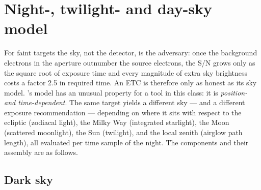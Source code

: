 \section{Night-, twilight- and day-sky model}
\label{sec:sky}

For faint targets the sky, not the detector, is the adversary: once the
background electrons in the aperture outnumber the source electrons, the
S/N grows only as the square root of exposure time and every magnitude of
extra sky brightness costs a factor 2.5 in required time. An ETC is
therefore only as honest as its sky model. \spetc{}'s model has an
unusual property for a tool in this class: it is \emph{position- and
time-dependent}. The same target yields a different sky --- and a
different exposure recommendation --- depending on where it sits with
respect to the ecliptic (zodiacal light), the Milky Way (integrated
starlight), the Moon (scattered moonlight), the Sun (twilight), and the
local zenith (airglow path length), all evaluated per time sample of the
night. The components and their assembly are as follows.

\subsection{Dark sky}

